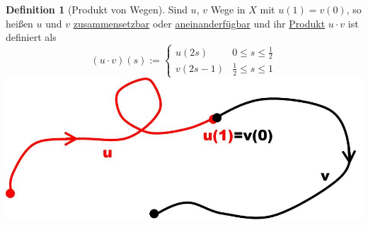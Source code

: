 \documentclass[a4paper,11pt,notitlepage]{report}
\theoremstyle{remark}
\theoremstyle{definition}
\newtheorem{definition}{Definition}[chapter]
\begin{document}
\begin{definition}[Produkt von Wegen]
	Sind $u$, $v$ Wege in $X$ mit $u(1)=v(0)$, so heißen $u$ und $v$ \underline{zusammensetzbar} oder \underline{aneinanderfügbar} und ihr \underline{Produkt} $u \cdot v$ ist definiert als
	$$(u \cdot v) (s) := \begin{cases} u(2s) & 0 \leq s \leq \frac{1}{2} \\ v(2s-1) & \frac{1}{2} \leq s \leq 1 \end{cases}$$
	\includegraphics[scale=0.4]{images/aneinanderfuegbar.jpg}
\end{definition}
\end{document}
